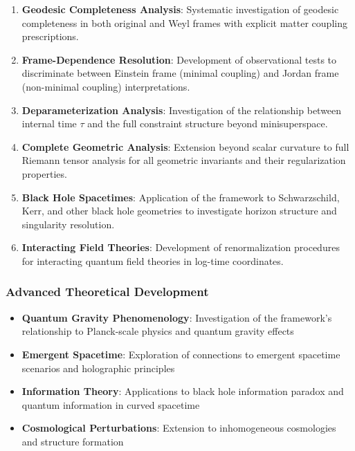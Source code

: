 \begin{enumerate}
\item \textbf{Geodesic Completeness Analysis}: Systematic investigation of geodesic completeness in both original and Weyl frames with explicit matter coupling prescriptions.

\item \textbf{Frame-Dependence Resolution}: Development of observational tests to discriminate between Einstein frame (minimal coupling) and Jordan frame (non-minimal coupling) interpretations.

\item \textbf{Deparameterization Analysis}: Investigation of the relationship between internal time $\tau$ and the full constraint structure beyond minisuperspace.

\item \textbf{Complete Geometric Analysis}: Extension beyond scalar curvature to full Riemann tensor analysis for all geometric invariants and their regularization properties.

\item \textbf{Black Hole Spacetimes}: Application of the framework to Schwarzschild, Kerr, and other black hole geometries to investigate horizon structure and singularity resolution.

\item \textbf{Interacting Field Theories}: Development of renormalization procedures for interacting quantum field theories in log-time coordinates.
\end{enumerate}

\subsubsection{Advanced Theoretical Development}

\begin{itemize}
\item \textbf{Quantum Gravity Phenomenology}: Investigation of the framework's relationship to Planck-scale physics and quantum gravity effects
\item \textbf{Emergent Spacetime}: Exploration of connections to emergent spacetime scenarios and holographic principles
\item \textbf{Information Theory}: Applications to black hole information paradox and quantum information in curved spacetime
\item \textbf{Cosmological Perturbations}: Extension to inhomogeneous cosmologies and structure formation
\end{itemize}

